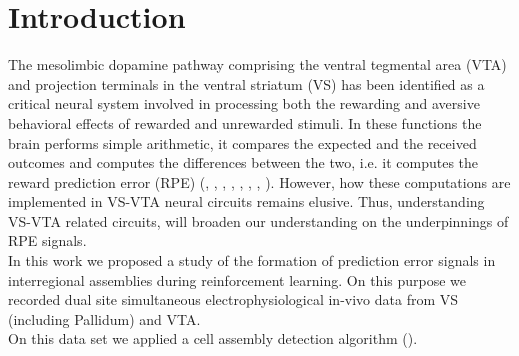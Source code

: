 \chapter{Introduction}
\label{chap:Introduction}
The mesolimbic dopamine pathway comprising the ventral tegmental area (VTA) and projection terminals in the ventral striatum (VS) has been identified as a critical neural system involved in processing both the rewarding and aversive behavioral effects of rewarded and unrewarded stimuli. In these functions the brain performs simple arithmetic, it compares the expected and the received outcomes and computes the differences between the two, i.e. it computes the reward prediction error (RPE) (\cite{Schultz2001}, \cite{Schultz2002}, \cite{Fiorillo}, \cite{Eshel1}, \cite{Pagnoni}, \cite{Radua}, \cite{Takahashi2016}, \cite{TianHuang}). However, how these computations are implemented in VS-VTA neural circuits remains elusive.
Thus, understanding VS-VTA related circuits, will broaden our understanding on the underpinnings of RPE signals.\\In this work we proposed a study of the formation of prediction error signals in interregional assemblies during reinforcement learning. On this purpose we recorded dual site simultaneous electrophysiological in-vivo data from VS (including Pallidum) and VTA.\\%
On this data set we applied a cell assembly detection algorithm (\cite{RussoDurstewitz}). %
